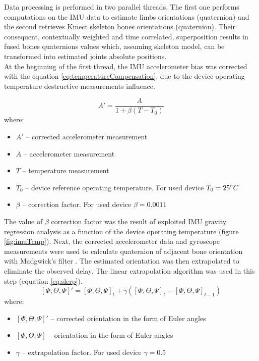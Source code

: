 \documentclass[9pt]{llncs}
\begin{document}
Data processing is performed in two parallel threads. The first one performs computations on the IMU data to estimate limbs orientations (quaternion) and the second retrieves Kinect skeleton bones orientations (quaternion). Their consequent, contextually weighted and time correlated, superposition results in fused bones quaternions values which, assuming skeleton model, can be transformed into estimated joints absolute positions.\\
At the beginning of the first thread, the IMU accelerometer bias was corrected with the equation \ref{eq:temperatureCompensation}, due to the device operating temperature destructive measurements influence.

\begin{equation}
	\label{eq:temperatureCompensation}
	A' = \frac{A}{1+\beta(T - T_0)}
\end{equation}
where:
\begin{itemize}
	\item $A'$ -- corrected accelerometer measurement
	\item $A$ -- accelerometer measurement
	\item $T$ -- temperature measurement
	\item $T_0$ -- device reference operating temperature. For used device $T_0 = 25\degree C$
	\item $\beta$ -- correction factor. For used device $\beta = 0.0011$
\end{itemize}

The value of $\beta$ correction factor was the result of exploited IMU gravity regression analysis as a function of the device operating temperature (figure \ref{fig:imuTemp}).
Next, the corrected accelerometer data and gyroscope measurements were used to calculate quaternion of adjacent bone orientation with Madgwick's filter \cite{Madgwick2010}. The estimated orientation was then extrapolated to eliminate the observed delay. The linear extrapolation algorithm was used in this step (equation \ref{eq:slerp}).
\begin{equation}
	\label{eq:slerp}
	[\Phi,\Theta,\Psi]' = [\Phi,\Theta,\Psi]_{t} + \gamma([\Phi,\Theta,\Psi]_{t} - [\Phi,\Theta,\Psi]_{t-1})
\end{equation}
where:
\begin{itemize}
	\item $[\Phi,\Theta,\Psi]'$ -- corrected orientation in the form of Euler angles
	\item $[\Phi,\Theta,\Psi]$ -- orientation in the form of Euler angles
	\item $\gamma$ -- extrapolation factor. For used device $\gamma = 0.5$
\end{itemize}
\end{document}
